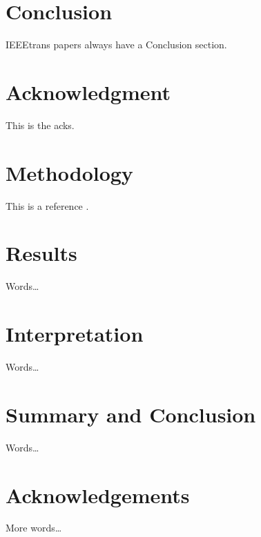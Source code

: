 \documentclass[conference]{IEEEtran}
\begin{document}

\section{Conclusion}

IEEEtrans papers always have a Conclusion section.

\section*{Acknowledgment}

This is the acks.

\section{Methodology}

This is a reference \cite{Loughry2013a}.

\section{Results}

Words\ldots

\section{Interpretation}

Words\ldots

\section{Summary and Conclusion}

Words\ldots

\section{Acknowledgements}

More words\ldots




\end{document}
